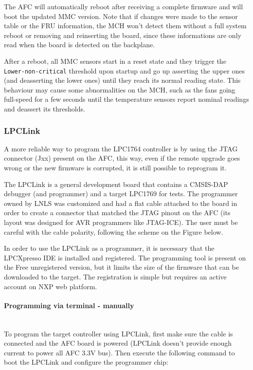\documentclass[letterpaper,12pt, titlepage]{article}
\newcommand{\newparagraph}[1]{\paragraph{#1}\mbox{}\\}
\begin{document}
The AFC will automatically reboot after receiving a complete firmware and will boot the updated MMC version. Note that if changes were made to the sensor table or the FRU information, the MCH won't detect them without a full system reboot or removing and reinserting the board, since these informations are only read when the board is detected on the backplane.

After a reboot, all MMC sensors start in a reset state and they trigger the \texttt{Lower-non-critical} threshold upon startup and go up asserting the upper ones (and deasserting the lower ones) until they reach its normal reading state.
This behaviour may cause some abnormalities on the MCH, such as the fans going full-speed for a few seconds until the temperature sensors report nominal readings and deassert its thresholds.


\subsubsection{LPCLink}
A more reliable way to program the LPC1764 controller is by using the JTAG connector (Jxx) present on the AFC, this way, even if the remote upgrade goes wrong or the new firmware is corrupted, it is still possible to reprogram it.

The LPCLink is a general development board that contains a CMSIS-DAP debugger (and programmer) and a target LPC1769 for tests. The programmer owned by LNLS was customized and had a flat cable attached to the board in order to create a connector that matched the JTAG pinout on the AFC (its layout was designed for AVR programmers like JTAG-ICE).
The user must be careful with the cable polarity, following the scheme on the Figure below.


In order to use the LPCLink as a programmer, it is necessary that the LPCXpresso IDE is installed and registered. The programming tool is present on the Free unregistered version, but it limits the size of the firmware that can be downloaded to the target. The registration is simple but requires an active account on NXP web platform.

\newparagraph{Programming via terminal - manually}
To program the target controller using LPCLink, first make sure the cable is connected and the AFC board is powered (LPCLink doesn't provide enough current to power all AFC 3.3V bus). Then execute the following command to boot the LPCLink and configure the programmer chip:
\end{document}
